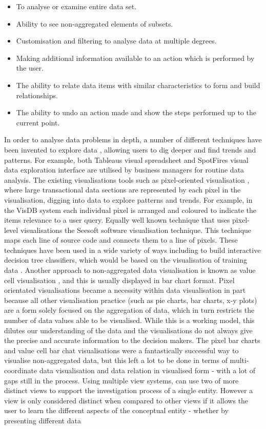 \begin{itemize}
\item To analyse or examine entire data set.
\item Ability to see non-aggregated elements of subsets.
\item Customisation and filtering to analyse data at multiple degrees.
\item Making additional information available to an action which is performed by the user.
\item The ability to relate data items with similar characteristics to form and build relationships.
\item The ability to undo an action made and show the steps performed up to the current point. 
\end{itemize}

In order to analyse data problems in depth, a number of different techniques have been invented to explore data \cite{wang2000guidelines, north2000snap,pillat2006coordinating,eick1999visualizing,stolte2002polaris}, allowing users to dig deeper and find trends and patterns. For example, both Tableaus visual spreadsheet \cite{tableau} and SpotFires visual data exploration interface \cite{spotfire} are utilised by business managers for routine data analysis. The existing visualisations tools such as pixel-oriented visualisation \cite{keim2002pixel}, where large transactional data sections are represented by each pixel in the visualisation, digging into data to explore patterns and trends. For example, in the VisDB system \cite{keim1994visdb} each individual pixel is arranged and coloured to indicate the items relevance to a user query. Equally well known technique that uses pixel-level visualisations the Seesoft software visualisation technique. This technique maps each line of source code and connects them to a line of pixels. These techniques have been used in a wide variety of ways including to build interactive decision tree classifiers, which would be based on the visualisation of training data \cite{eick1992seesoft}. Another approach to non-aggregated data visualisation is known as value cell visualisation \cite{keim2007value}, and this is usually displayed in bar chart format. Pixel orientated visualisations became a necessity within data visualisation in part because all other visualisation practice (such as pie charts, bar charts, x-y plots) are a form solely focused on the aggregation of data, which in  turn restricts the number of data values able to be visualised. While this is a working model, this dilutes our understanding of the data and the visualisations do not always give the precise and accurate information to the decision makers. The pixel bar charts and value cell bar chat visualisations were a fantastically successful way to visualise non-aggregated data, but this left a lot to be done in terms of multi-coordinate data visualisation and data relation in visualised form - with a lot of gaps still in the process. Using multiple view systems, can use two of more distinct views to support the investigation process of a single entity. However a view is only considered distinct when compared to other views if it allows the user to learn the different aspects of the conceptual entity - whether by presenting different data 